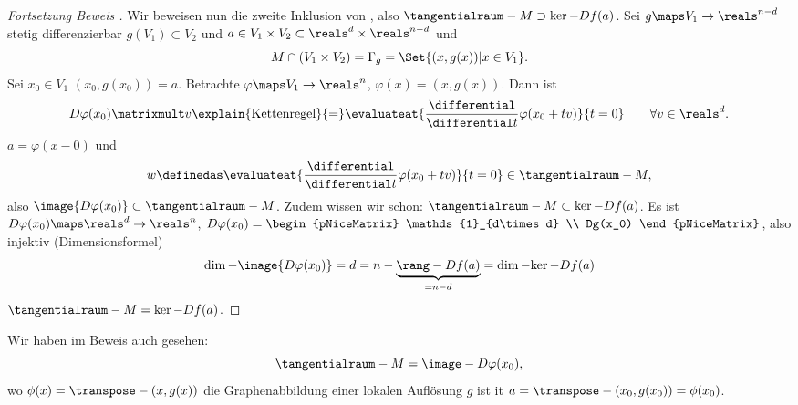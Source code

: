 \begin{proof}[Fortsetzung Beweis ]
  Wir beweisen nun die zweite Inklusion von , also \( \tangentialraum-{M}\supset \ker-{Df(a)} \). Sei \( g\maps V_1\to \reals^{n-d} \) stetig differenzierbar \sd \( g(V_1)\subset V_2 \) und \( a\in V_1\times V_2\subset \reals^d \times \reals^{n-d} \) und
\begin{equation*}
  M\cap (V_1\times V_2)=\Gamma_g=\Set{(x,g(x))|x\in V_1}.
\end{equation*}
Sei \( x_0\in V_1  \) \sd \( (x_0,g(x_0))=a \). Betrachte \( \varphi\maps V_1\to \reals^n \), \( \varphi(x)=(x,g(x)) \). Dann ist
\begin{equation*}
  D\varphi(x_0)\matrixmult v\explain{\text{Kettenregel}}{=}\evaluateat{\frac{\differential}{\differential t} \varphi(x_0+tv)}{t=0}\qquad \forall v\in \reals^d.
\end{equation*}
\timplies \( a=\varphi(x-0) \) und 
\begin{equation*}
  w\definedas \evaluateat{\frac{\differential}{\differential t} \varphi(x_0+tv)}{t=0}\in \tangentialraum-{M},
\end{equation*}
also \( \image{D\varphi(x_0)}\subset \tangentialraum-{M} \). Zudem wissen wir schon: \( \tangentialraum-{M}\subset \ker-{Df(a)} \). Es ist \( D\varphi(x_0)\maps \reals^d\to \reals^n \), \( D\varphi(x_0)=\begin{pNiceMatrix} \mathds{1}_{d\times d} \\ Dg(x_0) \end{pNiceMatrix} \), also injektiv \timplies (Dimensionsformel)
\begin{equation*}
  \dim-{}{\image{D\varphi(x_0)}}=d=n-\underbrace{\rang-{Df(a)}}_{=n-d}=\dim-{}{\ker-{Df(a)}}
\end{equation*}
\timplies \( \tangentialraum-{M}=\ker-{Df(a)} \).
\end{proof}
Wir haben im Beweis auch gesehen:
\begin{equation*}
  \tangentialraum-{M}=\image-{D\varphi(x_0)},
\end{equation*}
wo \( \phi(x)=\transpose-{(x,g(x))} \) die Graphenabbildung einer lokalen Auflösung \( g \) ist it \( a=\transpose-{(x_0,g(x_0))}=\phi(x_0) \).

